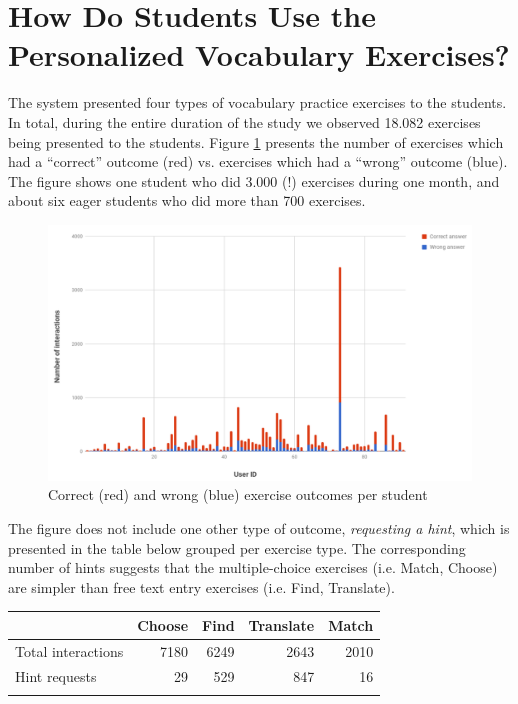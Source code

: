\newpage
\section{How Do Students Use the Personalized Vocabulary Exercises?}

The system presented four types of vocabulary practice exercises to the students. In total, during the entire duration of the study we observed 18.082 exercises being presented to the students. Figure \ref{fig:ex_interactions} presents the number of exercises which had a ``correct'' outcome (red) vs. exercises which had a ``wrong'' outcome (blue). The figure shows one student who did 3.000 (!) exercises during one month, and about six eager students who did more than 700 exercises. 

  \begin{figure}[h!]
  \centering
    \includegraphics[width=\columnwidth]{figures/exercise_interactions_count.png}
    \caption{Correct (red) and wrong (blue) exercise outcomes per student}
    \label{fig:ex_interactions}
  \end{figure}

The figure does not include one other type of outcome, {\em requesting a hint}, which is presented in the table below grouped per exercise type. The corresponding number of hints suggests that the multiple-choice exercises (i.e. Match, Choose) are simpler than free text entry exercises (i.e. Find, Translate).

\begin{tabular}{lrrrr}
                      & Choose  & Find & Translate & Match \\ \hline
  Total interactions  & 7180    & 6249 & 2643      & 2010\\
  Hint requests       & 29      & 529  & 847       & 16 \\ \hline
  \label{tab:hints_per_ex_type}
\end{tabular}


